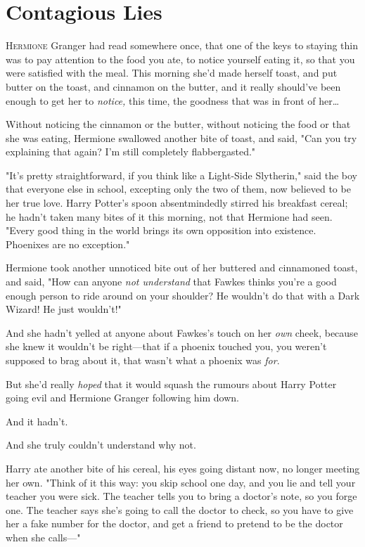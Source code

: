 \chapter{Contagious Lies}

\lettrine{H}{ermione} Granger
had read somewhere once, that one of the keys to staying thin was to pay
attention to the food you ate, to notice yourself eating it, so that you were
satisfied with the meal. This morning she’d made herself toast, and put butter
on the toast, and cinnamon on the butter, and it really should’ve been enough
to get her to \emph{notice,} this time, the goodness that was in front of
her…

Without noticing the cinnamon or the butter, without noticing the food or that
she was eating, Hermione swallowed another bite of toast, and said, "Can you
try explaining that again? I’m still completely flabbergasted."

"It’s pretty straightforward, if you think like a Light-Side Slytherin," said
the boy that everyone else in school, excepting only the two of them, now
believed to be her true love. Harry Potter’s spoon absentmindedly stirred his
breakfast cereal; he hadn’t taken many bites of it this morning, not that
Hermione had seen. "Every good thing in the world brings its own opposition
into existence. Phoenixes are no exception."

Hermione took another unnoticed bite out of her buttered and cinnamoned toast,
and said, "How can anyone \emph{not understand} that Fawkes thinks you’re a
good enough person to ride around on your shoulder? He wouldn’t do that with a
Dark Wizard! He just wouldn’t!"

And she hadn’t yelled at anyone about Fawkes’s touch on her \emph{own} cheek,
because she knew it wouldn’t be right—that if a phoenix touched you, you
weren’t supposed to brag about it, that wasn’t what a phoenix was \emph{for}.

But she’d really \emph{hoped} that it would squash the rumours about Harry
Potter going evil and Hermione Granger following him down.

And it hadn’t.

And she truly couldn’t understand why not.

Harry ate another bite of his cereal, his eyes going distant now, no longer
meeting her own. "Think of it this way: you skip school one day, and you lie
and tell your teacher you were sick. The teacher tells you to bring a doctor’s
note, so you forge one. The teacher says she’s going to call the doctor to
check, so you have to give her a fake number for the doctor, and get a friend
to pretend to be the doctor when she calls—"

